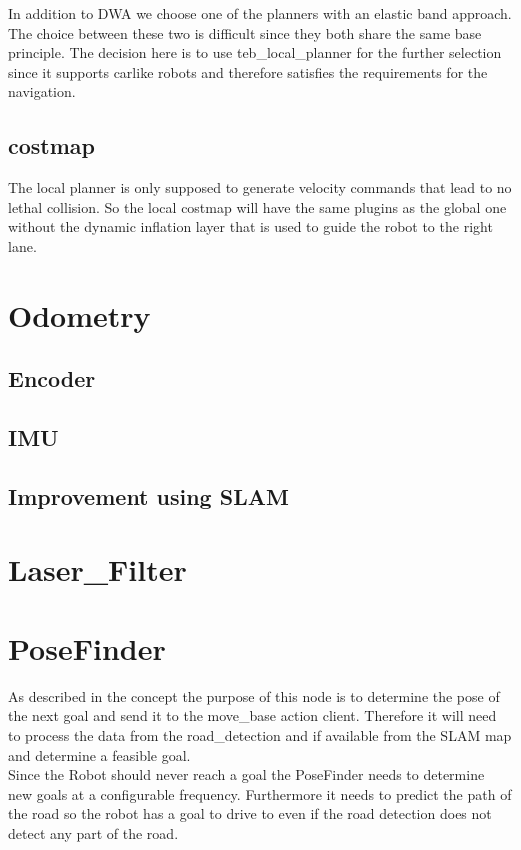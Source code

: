 In addition to DWA we choose one of the planners with an elastic band approach. The choice between these two is difficult since they both share the same base principle. The decision here is to use teb\_local\_planner for the further selection since it supports carlike robots and therefore satisfies the requirements for the navigation.\\

\subsection{costmap}
The local planner is only supposed to generate velocity commands that lead to no lethal collision. So the local costmap will have the same plugins as the global one without the dynamic inflation layer that is used to guide the robot to the right lane.

\section{Odometry}

\subsection{Encoder}
\subsection{IMU}
\subsection{Improvement using SLAM}

\section{Laser\_Filter}


\section{PoseFinder}
As described in the concept the purpose of this node is to determine the pose of the next goal and send it to the move\_base action client. Therefore it will need to process the data from the road\_detection and if available from the SLAM map and determine a feasible goal.\\
Since the Robot should never reach a goal the PoseFinder needs to determine new goals at a configurable frequency. Furthermore it needs to predict the path of the road so the robot has a goal to drive to even if the road detection does not detect any part of the road.



